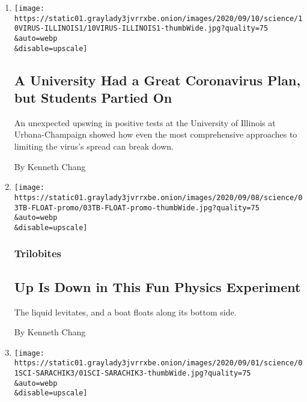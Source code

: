 \begin{enumerate}
\def\labelenumi{\arabic{enumi}.}
\item
  \href{/2020/09/10/health/university-illinois-covid.html}{}

  \texttt{[image: https://static01.graylady3jvrrxbe.onion/images/2020/09/10/science/10VIRUS-ILLINOIS1/10VIRUS-ILLINOIS1-thumbWide.jpg?quality=75\\\&auto=webp\\\&disable=upscale]}

  \hypertarget{a-university-had-a-great-coronavirus-plan-but-students-partied-on}{%
  \subsection{A University Had a Great Coronavirus Plan, but Students
  Partied
  On}\label{a-university-had-a-great-coronavirus-plan-but-students-partied-on}}

  An unexpected upswing in positive tests at the University of Illinois
  at Urbana-Champaign showed how even the most comprehensive approaches
  to limiting the virus's spread can break down.

  By Kenneth Chang
\item
  \href{/2020/09/03/science/floating-upside-down-liquid.html}{}

  \texttt{[image: https://static01.graylady3jvrrxbe.onion/images/2020/09/08/science/03TB-FLOAT-promo/03TB-FLOAT-promo-thumbWide.jpg?quality=75\\\&auto=webp\\\&disable=upscale]}

  \hypertarget{trilobites}{%
  \subsubsection{Trilobites}\label{trilobites}}

  \hypertarget{up-is-down-in-this-fun-physics-experiment}{%
  \subsection{Up Is Down in This Fun Physics
  Experiment}\label{up-is-down-in-this-fun-physics-experiment}}

  The liquid levitates, and a boat floats along its bottom side.

  By Kenneth Chang
\item
  \href{/2020/08/31/science/myriam-sarachik-physics.html}{}

  \texttt{[image: https://static01.graylady3jvrrxbe.onion/images/2020/09/01/science/01SCI-SARACHIK3/01SCI-SARACHIK3-thumbWide.jpg?quality=75\\\&auto=webp\\\&disable=upscale]}


\end{enumerate}
